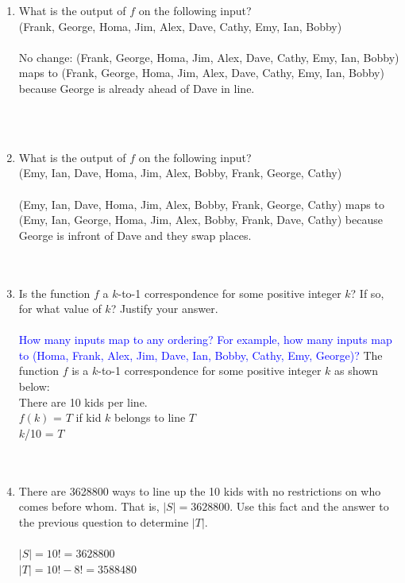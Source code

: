 \documentclass{amsart}
\theoremstyle{definition}
\theoremstyle{Exercise}
\theoremstyle{remark}
\theoremstyle{rule}
\numberwithin{equation}{section}
\begin{document}
\begin{enumerate}[label=(\alph*)]
  \item What is the output of $f$ on the following input?\\
  (Frank, George, Homa, Jim, Alex, Dave, Cathy, Emy, Ian, Bobby)\\\\
No change: (Frank, George, Homa, Jim, Alex, Dave, Cathy, Emy, Ian, Bobby) maps to (Frank, George, Homa, Jim, Alex, Dave, Cathy, Emy, Ian, Bobby) because George is already ahead of Dave in line.

\\\\
  \item What is the output of $f$ on the following input?\\
(Emy, Ian, Dave, Homa, Jim, Alex, Bobby, Frank, George, Cathy)\\\\
(Emy, Ian, Dave, Homa, Jim, Alex, Bobby, Frank, George, Cathy) maps to (Emy, Ian, George, Homa, Jim, Alex, Bobby, Frank, Dave, Cathy) because George is infront of Dave and they swap places.
\\\\\
  \item Is the function $f$ a $k$-to-1 correspondence for some positive integer $k$? If so, for what value of $k$? Justify your answer.\\\\
  
  \textcolor{blue}{How many inputs map to any ordering?  For example, how many inputs map to (Homa, Frank, Alex, Jim, Dave, Ian, Bobby, Cathy, Emy, George)?}
The function $f$ is a $k$-to-1 correspondence for some positive integer $k$ as shown below:\\
There are 10 kids per line.\\
$f(k)$ = $T$ if kid $k$ belongs to line $T$\\
$k$/10 = $T$\\
\\\\
  \item There are 3628800 ways to line up the 10 kids with no restrictions on who comes before whom. That is, $|S| =3628800$. Use this fact and the answer to the previous question to determine $|T|$.\\\\
$|S| = 10! = 3628800$\\
$|T| = 10! - 8! = 3588480$\\
\\\\
\end{enumerate}
\end{document}

